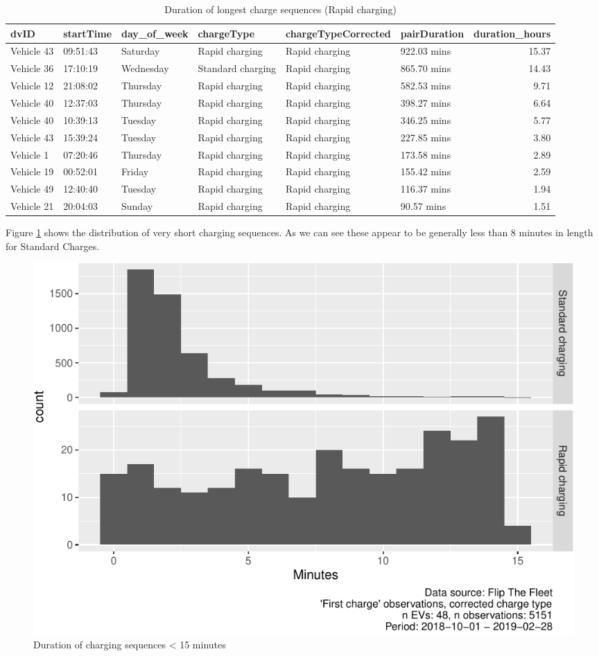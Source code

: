 \documentclass[]{article}
\begin{document}
\begin{table}[t]

\caption{\label{tab:durationLongTableRapid}Duration of longest charge sequences (Rapid charging)}
\centering
\begin{tabular}{l|l|l|l|l|l|r}
\hline
dvID & startTime & day\_of\_week & chargeType & chargeTypeCorrected & pairDuration & duration\_hours\\
\hline
Vehicle 43 & 09:51:43 & Saturday & Rapid charging & Rapid charging & 922.03 mins & 15.37\\
\hline
Vehicle 36 & 17:10:19 & Wednesday & Standard charging & Rapid charging & 865.70 mins & 14.43\\
\hline
Vehicle 12 & 21:08:02 & Thursday & Rapid charging & Rapid charging & 582.53 mins & 9.71\\
\hline
Vehicle 40 & 12:37:03 & Thursday & Rapid charging & Rapid charging & 398.27 mins & 6.64\\
\hline
Vehicle 40 & 10:39:13 & Tuesday & Rapid charging & Rapid charging & 346.25 mins & 5.77\\
\hline
Vehicle 43 & 15:39:24 & Tuesday & Rapid charging & Rapid charging & 227.85 mins & 3.80\\
\hline
Vehicle 1 & 07:20:46 & Thursday & Rapid charging & Rapid charging & 173.58 mins & 2.89\\
\hline
Vehicle 19 & 00:52:01 & Friday & Rapid charging & Rapid charging & 155.42 mins & 2.59\\
\hline
Vehicle 49 & 12:40:40 & Tuesday & Rapid charging & Rapid charging & 116.37 mins & 1.94\\
\hline
Vehicle 21 & 20:04:03 & Sunday & Rapid charging & Rapid charging & 90.57 mins & 1.51\\
\hline
\end{tabular}
\end{table}

Figure \ref{fig:shortDuration} shows the distribution of very short charging sequences. As we can see these appear to be generally less than 8 minutes in length for Standard Charges.

\begin{figure}
\centering
\includegraphics{EVBB_report_v1_files/figure-latex/shortDuration-1.pdf}
\caption{\label{fig:shortDuration}Duration of charging sequences \textless{} 15 minutes}
\end{figure}
\end{document}
